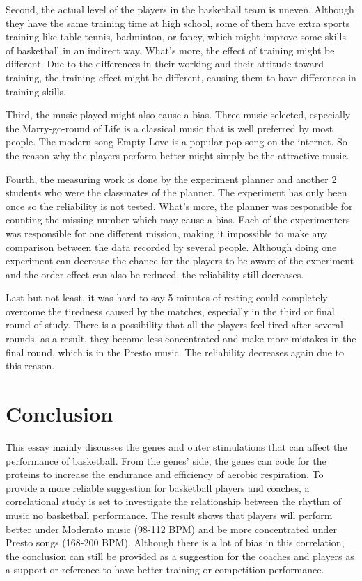 \documentclass{article}
\begin{document}
Second, the actual level of the players in the basketball team is uneven. Although they have the same training time at high school, some of them have extra sports training like table tennis, badminton, or fancy, which might improve some skills of basketball in an indirect way. What's more, the effect of training might be different. Due to the differences in their working and their attitude toward training, the training effect might be different, causing them to have differences in training skills. 

Third, the music played might also cause a bias. Three music selected, especially the Marry-go-round of Life is a classical music that is well preferred by most people. The modern song Empty Love is a popular pop song on the internet. So the reason why the players perform better might simply be the attractive music. 

Fourth, the measuring work is done by the experiment planner and another 2 students who were the classmates of the planner. The experiment has only been once so the reliability is not tested. What's more, the planner was responsible for counting the missing number which may cause a bias. Each of the experimenters was responsible for one different mission, making it impossible to make any comparison between the data recorded by several people. Although doing one experiment can decrease the chance for the players to be aware of the experiment and the order effect can also be reduced, the reliability still decreases.

Last but not least, it was hard to say 5-minutes of resting could completely overcome the tiredness caused by the matches, especially in the third or final round of study. There is a possibility that all the players feel tired after several rounds, as a result, they become less concentrated and make more mistakes in the final round, which is in the Presto music. The reliability decreases again due to this reason.

\section{Conclusion}

This essay mainly discusses the genes and outer stimulations that can affect the performance of basketball. From the genes' side, the genes can code for the proteins to increase the endurance and efficiency of aerobic respiration. To provide a more reliable suggestion for basketball players and coaches, a correlational study is set to investigate the relationship between the rhythm of music no basketball performance. The result shows that players will perform better under Moderato music (98-112 BPM) and be more concentrated under Presto songs (168-200 BPM). Although there is a lot of bias in this correlation, the conclusion can still be provided as a suggestion for the coaches and players as a support or reference to have better training or competition performance.
\newpage
\printbibliography{}
\end{document}
